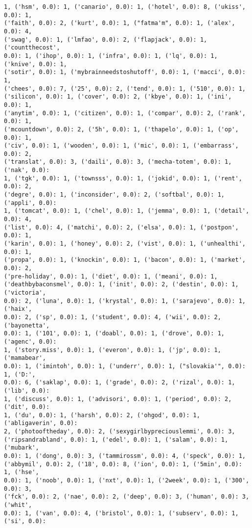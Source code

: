 \documentclass[11pt]{article}
\begin{document}
\begin{Verbatim}[commandchars=\\\{\}]
1, ('hsm', 0.0): 1, ('canario', 0.0): 1, ('hotel', 0.0): 8, ('ukiss', 0.0): 1,
('faith', 0.0): 2, ('kurt', 0.0): 1, ("fatma'm", 0.0): 1, ('alex', 0.0): 4,
('swag', 0.0): 1, ('lmfao', 0.0): 2, ('flapjack', 0.0): 1, ('countthecost',
0.0): 1, ('ihop', 0.0): 1, ('infra', 0.0): 1, ('lq', 0.0): 1, ('knive', 0.0): 1,
('sotir', 0.0): 1, ('mybrainneedstoshutoff', 0.0): 1, ('macci', 0.0): 1,
('chees', 0.0): 7, ('25', 0.0): 2, ('tend', 0.0): 1, ('510', 0.0): 1,
('silicon', 0.0): 1, ('cover', 0.0): 2, ('kbye', 0.0): 1, ('ini', 0.0): 1,
('anytim', 0.0): 1, ('citizen', 0.0): 1, ('compar', 0.0): 2, ('rank', 0.0): 1,
('mcountdown', 0.0): 2, ('5h', 0.0): 1, ('thapelo', 0.0): 1, ('op', 0.0): 1,
('civ', 0.0): 1, ('wooden', 0.0): 1, ('mic', 0.0): 1, ('embarrass', 0.0): 2,
('translat', 0.0): 3, ('daili', 0.0): 3, ('mecha-totem', 0.0): 1, ('nak', 0.0):
1, ('tgk', 0.0): 1, ('townsss', 0.0): 1, ('jokid', 0.0): 1, ('rent', 0.0): 2,
('degre', 0.0): 1, ('inconsider', 0.0): 2, ('softbal', 0.0): 1, ('appli', 0.0):
1, ('tomcat', 0.0): 1, ('chel', 0.0): 1, ('jemma', 0.0): 1, ('detail', 0.0): 4,
('list', 0.0): 4, ('matchi', 0.0): 2, ('elsa', 0.0): 1, ('postpon', 0.0): 1,
('karin', 0.0): 1, ('honey', 0.0): 2, ('vist', 0.0): 1, ('unhealthi', 0.0): 1,
('propa', 0.0): 1, ('knockin', 0.0): 1, ('bacon', 0.0): 1, ('market', 0.0): 2,
('pre-holiday', 0.0): 1, ('diet', 0.0): 1, ('meani', 0.0): 1,
('deathbybaconsmel', 0.0): 1, ('init', 0.0): 2, ('destin', 0.0): 1, ('victoria',
0.0): 2, ('luna', 0.0): 1, ('krystal', 0.0): 1, ('sarajevo', 0.0): 1, ('haix',
0.0): 2, ('sp', 0.0): 1, ('student', 0.0): 4, ('wii', 0.0): 2, ('bayonetta',
0.0): 1, ('101', 0.0): 1, ('doabl', 0.0): 1, ('drove', 0.0): 1, ('agenc', 0.0):
1, ('story.miss', 0.0): 1, ('everon', 0.0): 1, ('jp', 0.0): 1, ('mamabear',
0.0): 1, ('imintoh', 0.0): 1, ('underr', 0.0): 1, ("slovakia'", 0.0): 1, ('D:',
0.0): 6, ('saklap', 0.0): 1, ('grade', 0.0): 2, ('rizal', 0.0): 1, ('lib', 0.0):
1, ('discuss', 0.0): 1, ('advisori', 0.0): 1, ('period', 0.0): 2, ('dit', 0.0):
1, ('du', 0.0): 1, ('harsh', 0.0): 2, ('ohgod', 0.0): 1, ('abligaverin', 0.0):
2, ('photooftheday', 0.0): 2, ('sexygirlbypreciouslemmi', 0.0): 3,
('ripsandrabland', 0.0): 1, ('edel', 0.0): 1, ('salam', 0.0): 1, ('mubark',
0.0): 1, ('dong', 0.0): 3, ('tammirossm', 0.0): 4, ('speck', 0.0): 1,
('abbymil', 0.0): 2, ('18', 0.0): 8, ('ion', 0.0): 1, ('5min', 0.0): 1, ('hse',
0.0): 1, ('noob', 0.0): 1, ('nxt', 0.0): 1, ('2week', 0.0): 1, ('300', 0.0): 3,
('fck', 0.0): 2, ('nae', 0.0): 2, ('deep', 0.0): 3, ('human', 0.0): 3, ('whit',
0.0): 1, ('van', 0.0): 4, ('bristol', 0.0): 1, ('subserv', 0.0): 1, ('si', 0.0):

\end{Verbatim}
\end{document}
